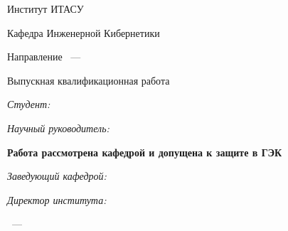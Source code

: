 \thispagestyle{empty}%

\begin{center}%
    \MakeUppercase{\thesisOrganization}
\end{center}%
%

\vspace{0pt plus1fill} %
\begin{center}%
    
    Институт ИТАСУ
    
    Кафедра Инженерной Кибернетики
    
    Направление \thesisSpecialtyNumber~---~\thesisSpecialtyTitle

\end{center}

\vspace{0pt plus4fill} 

\begin{center}%
    {\large Выпускная квалификационная работа \thesisDegree}
    
    \vspace{0pt plus2fill}
    
    \textbf {\large \thesisTitle}
    
\end{center}

\vspace{0pt plus4fill}

\begin{flushleft}%
    \linespread{2}\selectfont\emph{Студент:}   
    \thesisAuthor
    
    \linespread{2}\selectfont\emph{Научный руководитель:} 
    \supervisorRegalia~  
    \supervisorFio
    
    \vspace{0pt plus3fill}
    
    \linespread{2}\selectfont\textbf{Работа рассмотрена кафедрой и допущена к защите в ГЭК}
    
    \linespread{2}\selectfont\emph{Заведующий кафедрой:}\hrulefill
    
    \linespread{2}\selectfont\emph{Директор института:}\hrulefill

\end{flushleft}%
%

\vspace{0pt plus1fill}


\begin{center}%
    {\thesisCity~--- \thesisYear}
\end{center}%
\newpage
